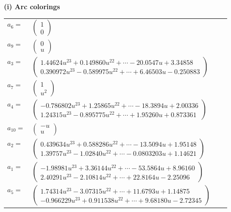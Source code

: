 \documentclass[1p]{elsarticle_modified}
\theoremstyle{definition}
\begin{document}
\flushleft \textbf{(i) Arc colorings}\\
\begin{tabular}{m{7pt} m{180pt} m{7pt} m{180pt} }
\flushright $a_{6}=$&$\begin{pmatrix}1\\0\end{pmatrix}$ \\
\flushright $a_{9}=$&$\begin{pmatrix}0\\u\end{pmatrix}$ \\
\flushright $a_{3}=$&$\begin{pmatrix}1.44624 u^{23}+0.149860 u^{22}+\cdots-20.0547 u+3.34858\\0.390972 u^{23}-0.589975 u^{22}+\cdots+6.46503 u-0.250883\end{pmatrix}$ \\
\flushright $a_{7}=$&$\begin{pmatrix}1\\u^2\end{pmatrix}$ \\
\flushright $a_{4}=$&$\begin{pmatrix}-0.786802 u^{23}+1.25865 u^{22}+\cdots-18.3894 u+2.00336\\1.24315 u^{23}-0.895775 u^{22}+\cdots+1.95260 u+0.873361\end{pmatrix}$ \\
\flushright $a_{10}=$&$\begin{pmatrix}- u\\u\end{pmatrix}$ \\
\flushright $a_{2}=$&$\begin{pmatrix}0.439634 u^{23}+0.588286 u^{22}+\cdots-13.5094 u+1.95148\\1.39757 u^{23}-1.02840 u^{22}+\cdots-0.0803203 u+1.14621\end{pmatrix}$ \\
\flushright $a_{1}=$&$\begin{pmatrix}-1.98981 u^{23}+3.36144 u^{22}+\cdots-53.5864 u+8.96160\\2.40291 u^{23}-2.10814 u^{22}+\cdots+22.8164 u-2.25096\end{pmatrix}$ \\
\flushright $a_{5}=$&$\begin{pmatrix}1.74314 u^{23}-3.07315 u^{22}+\cdots+11.6793 u+1.14875\\-0.966229 u^{23}+0.911538 u^{22}+\cdots+9.68180 u-2.72345\end{pmatrix}$ \\

\end{tabular}
\end{document}
